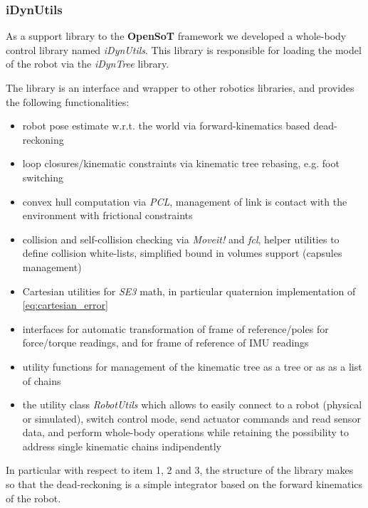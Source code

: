 \subsubsection{iDynUtils}
\label{sec:idynutils}
As a support library to the \textbf{OpenSoT} framework we developed a whole-body control library named \emph{iDynUtils}.
This library is responsible for loading the model of the robot via the \emph{iDynTree}\cite{Nori2015-zb,Nori2015-db} library.

The library is an interface and wrapper to other robotics libraries, and provides the following functionalities:
\begin{itemize}
\item robot pose estimate w.r.t. the world via forward-kinematics based dead-reckoning
\item loop closures/kinematic constraints via kinematic tree rebasing, e.g. foot switching
\item convex hull computation via \emph{PCL}, management of link is contact with the environment with frictional constraints
\item collision and self-collision checking via \emph{Moveit!} and \emph{fcl}, helper utilities to define collision white-lists, simplified bound in volumes support (capsules management)
\item Cartesian utilities for \emph{SE3} math, in particular quaternion implementation of \ref{eq:cartesian_error}
\item interfaces for automatic transformation of frame of reference/poles for force/torque readings, and for frame of reference of IMU readings
\item utility functions for management of the kinematic tree as a tree or as as a list of chains
\item the utility class \emph{RobotUtils} which allows to easily connect to a robot (physical or simulated), switch control mode, send actuator commands and read sensor data, and perform whole-body operations while retaining the possibility to address single kinematic chains indipendently
\end{itemize}
In particular with respect to item 1, 2 and 3, the structure of the library makes so that the dead-reckoning is a simple integrator based on the forward kinematics of the robot.
